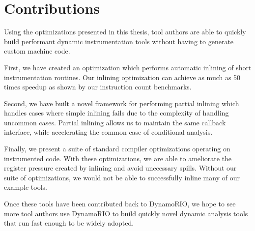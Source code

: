 \chapter{Contributions}
\label{sec:contributions}

Using the optimizations presented in this thesis, tool authors are able to
quickly build performant dynamic instrumentation tools without having to
generate custom machine code.

First, we have created an optimization which performs automatic inlining of
short instrumentation routines.  Our inlining optimization can achieve as much
as 50 times speedup as shown by our instruction count benchmarks.

Second, we have built a novel framework for performing partial inlining which
handles cases where simple inlining fails due to the complexity of handling
uncommon cases.  Partial inlining allows us to maintain the same callback
interface, while accelerating the common case of conditional analysis.

Finally, we present a suite of standard compiler optimizations operating on
instrumented code.  With these optimizations, we are able to ameliorate the
register pressure created by inlining and avoid unecessary spills.  Without our
suite of optimizations, we would not be able to successfully inline many of our
example tools.

Once these tools have been contributed back to DynamoRIO, we hope to see more
tool authors use DynamoRIO to build quickly novel dynamic analysis tools that
run fast enough to be widely adopted.
